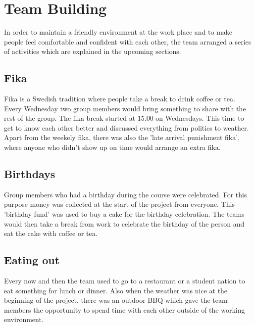 \section{Team Building}

In order to maintain a friendly environment at the work place and to make people
feel comfortable and confident with each other, the team arranged a series of activities
which are explained in the upcoming sections.

\subsection{Fika}
Fika is a Swedish tradition where people take a break to drink coffee or tea. Every Wednesday two group members would bring something to share with the rest of the group. The fika break started at 15.00 
on Wednesdays. This time to get to know each other better and discussed 
everything from politics to weather. Apart from the weekely fika, there was also the 'late arrival punishment fika',
where anyone who didn't show up on time would arrange an extra fika.

\subsection{Birthdays}
Group members who had a birthday during the course were celebrated. For this purpose 
money was collected at the start of the project from everyone. This 'birthday fund' was used to buy a cake for the birthday celebration. 
The teams would then take a break from work to celebrate the birthday of the person and eat the cake with coffee or tea. 

\subsection{Eating out}
Every now and then the team used to go to a restaurant or a student nation to eat something for lunch or dinner. Also when the weather 
was nice at the beginning of the project, there was an outdoor BBQ which gave the team members the opportunity to spend time with each
other outside of the working environment.
